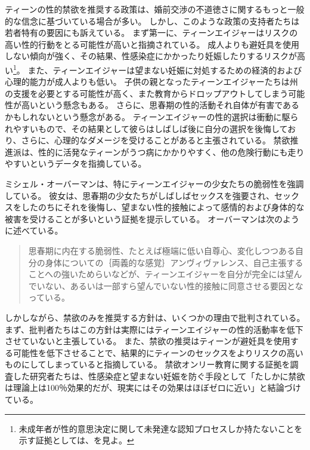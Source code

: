 \documentclass[paper=a4,book,openany]{jlreq}
\begin{document}
ティーンの性的禁欲を推奨する政策は、婚前交渉の不道徳さに関するもっと一般的な信念に基づいている場合が多い。
しかし、このような政策の支持者たちは若者特有の要因にも訴えている。
まず第一に、ティーンエイジャーはリスクの高い性的行動をとる可能性が高いと指摘されている。
成人よりも避妊具を使用しない傾向が強く、その結果、性感染症にかかったり妊娠したりするリスクが高い\footnote{未成年者が性的意思決定に関して未発達な認知プロセスしか持たないことを示す証拠としては、\citet{drobac14:_neurob_decis_makin_high_risk}を見よ。}。
また、ティーンエイジャーは望まない妊娠に対処するための経済的および心理的能力が成人よりも低い。
子供の親となったティーンエイジャーたちは州の支援を必要とする可能性が高く、また教育からドロップアウトしてしまう可能性が高いという懸念もある。
さらに、思春期の性的活動それ自体が有害であるかもしれないという懸念がある。
ティーンエイジャーの性的選択は衝動に駆られやすいもので、その結果として彼らはしばしば後に自分の選択を後悔しており、さらに、心理的なダメージを受けることがあると主張されている。
禁欲推進派は、性的に活発なティーンがうつ病にかかりやすく、他の危険行動にも走りやすいというデータを指摘している\citep[pp.163--170]{hallfors05:_which_comes_first_adoles}。

ミシェル・オーバーマンは、特にティーンエイジャーの少女たちの脆弱性を強調している。
彼女は、思春期の少女たちがしばしばセックスを強要され、セックスをしたのちにそれを後悔し、望まない性的接触によって感情的および身体的な被害を受けることが多いという証拠を提示している。
オーバーマンは次のように述べている。

\begin{quote}
思春期に内在する脆弱性、たとえば極端に低い自尊心、変化しつつある自分の身体についての｛両義的な感覚｝{アンヴィヴァレンス}、自己主張することへの強いためらいなどが、ティーンエイジャーを自分が完全には望んでいない、あるいは一部すら望んでいない性的接触に同意させる要因となっている。
\citep[p.709]{oberman01:_girls_master_house}
\end{quote}

しかしながら、禁欲のみを推奨する方針は、いくつかの理由で批判されている。
まず、批判者たちはこの方針は実際にはティーンエイジャーの性的活動率を低下させていないと主張している。
また、禁欲の推奨はティーンが避妊具を使用する可能性を低下させることで、結果的にティーンのセックスをよりリスクの高いものにしてしまっていると指摘している。
禁欲オンリー教育に関する証拠を調査した研究者たちは、性感染症と望まない妊娠を防ぐ手段として「たしかに禁欲は理論上は100％効果的だが、現実にはその効果はほぼゼロに近い」と結論づけている\citep{santelli06:_abstin_abstin_only_educat}。
\end{document}
